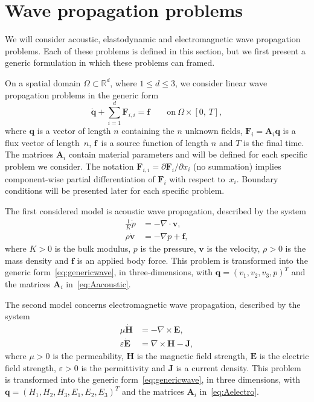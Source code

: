 \documentclass[a4paper]{article}
\renewcommand{\vec}{\boldsymbol}
\begin{document}
\section{Wave propagation problems}
\label{sec:problem}

We will consider acoustic, elastodynamic and electromagnetic wave
propagation problems. Each of these problems is defined in this
section, but we first present a generic formulation in which these
problems can framed.

On a spatial domain $\Omega \subset \mathbb{R}^{d}$, where $1 \le d
\le 3$, we consider linear wave propagation problems in the generic
form
\begin{equation}
  \label{eq:genericwave}
  \Dot{\vec{q}} + \sum_{i = 1}^{d} \vec{F}_{i, i}
    = \vec{f} \qquad \text{on} \ \Omega \times[0,\, T],
\end{equation}
where $\vec{q}$ is a vector of length $n$ containing the $n$ unknown
fields, $\vec{F}_{i} = \vec{A}_i \vec{q}$ is a flux vector of
length~$n$, $\vec{f}$~is a source function of length $n$ and $T$ is
the final time. The matrices $\vec{A}_i$ contain material parameters
and will be defined for each specific problem we consider. The
notation $\vec{F}_{i,i} = \partial \vec{F}_{i}/ \partial x_{i}$ (no
summation) implies component-wise partial differentiation of
$\boldsymbol{F}_{i}$ with respect to~$x_{i}$.  Boundary conditions
will be presented later for each specific problem.

The first considered model is acoustic wave propagation, described by
the system
\begin{equation}
  \begin{aligned}
    \frac{1}{K}\Dot{p} &=  -\nabla \cdot \vec{v},
    \\
    \rho \Dot{\vec{v}} &=  -\nabla p + \vec{f},
  \end{aligned}
  \label{eq:asyst}
\end{equation}
where $K > 0$ is the bulk modulus, $p$ is the pressure, $\vec{v}$ is
the velocity, $\rho > 0$ is the mass density and $\vec{f}$ is an
applied body force. This problem is transformed into the generic
form~\eqref{eq:genericwave}, in three-dimensions, with $\vec{q} =
(v_1, v_2, v_3, p)^T$ and the matrices $\vec{A}_i$
in~\eqref{eq:Aacoustic}.

The second model concerns electromagnetic wave propagation, described
by the system
\begin{equation}
  \begin{aligned}
    \mu \Dot{\vec{H}}  &=  -\nabla \times \vec{E},
    \\
    \varepsilon \Dot{\vec{E}}  &=  \nabla \times \vec{H} - \vec{J},
  \end{aligned}
  \label{eq:emsyst}
\end{equation}
where $\mu > 0$ is the permeability, $\vec{H}$ is the magnetic field
strength, $\vec{E}$ is the electric field strength, $\varepsilon > 0$
is the permittivity and $\vec{J}$ is a current density. This problem
is transformed into the generic form~\eqref{eq:genericwave}, in three
dimensions, with $\vec{q} = (H_1, H_2, H_3, E_1, E_2, E_3)^T$ and the
matrices $\vec{A}_i$ in~\eqref{eq:Aelectro}.
\end{document}
